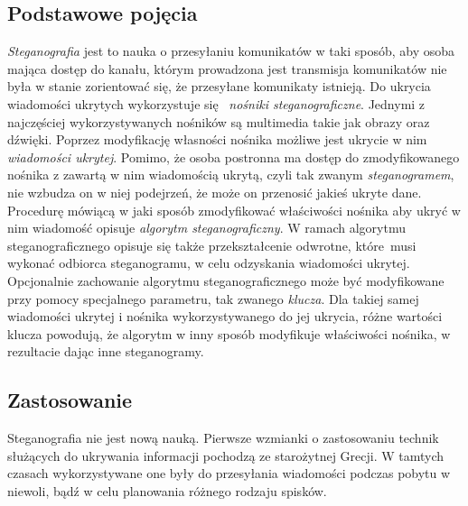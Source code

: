 \documentclass[a4paper, twoside, 12pt]{report}
\begin{document}
        \subsection{Podstawowe pojęcia}
        \emph{Steganografia} jest to nauka o przesyłaniu komunikatów w taki sposób, aby
        osoba mająca dostęp do kanału, którym prowadzona jest transmisja komunikatów
        nie była w stanie zorientować się, że przesyłane komunikaty istnieją.
        Do ukrycia wiadomości ukrytych wykorzystuje się 
        \emph{nośniki steganograficzne}\cite{STEGANOGRAFIASIECIOWAART}.
        Jednymi z najczęściej wykorzystywanych nośników są multimedia takie jak
        obrazy oraz dźwięki. Poprzez modyfikację własności nośnika możliwe jest
        ukrycie w nim \emph{wiadomości ukrytej}. Pomimo, że osoba postronna ma
        dostęp do zmodyfikowanego nośnika z zawartą w nim wiadomością ukrytą,
        czyli tak zwanym \emph{steganogramem}, nie wzbudza on w niej podejrzeń,
        że może on przenosić jakieś ukryte dane. Procedurę mówiącą w jaki sposób
        zmodyfikować właściwości nośnika aby ukryć w nim wiadomość opisuje
        \emph{algorytm steganograficzny}. W ramach algorytmu steganograficznego
        opisuje się także przekształcenie odwrotne, które musi
        wykonać odbiorca steganogramu, w celu odzyskania wiadomości ukrytej.
        Opcjonalnie zachowanie algorytmu steganograficznego może być modyfikowane przy pomocy specjalnego
        parametru, tak zwanego \emph{klucza}.  Dla takiej samej wiadomości ukrytej i nośnika
        wykorzystywanego do jej ukrycia, różne wartości klucza powodują, że algorytm
        w inny sposób modyfikuje właściwości nośnika, w rezultacie dając inne
        steganogramy.

        \subsection{Zastosowanie}
        Steganografia nie jest nową nauką. Pierwsze wzmianki o zastosowaniu technik
        służących do ukrywania informacji pochodzą ze starożytnej Grecji.\cite{STEGANOGRAPHYINTRO}
        W tamtych czasach wykorzystywane one były do przesyłania wiadomości
        podczas pobytu w niewoli, bądź w celu planowania różnego rodzaju spisków.
\end{document}
